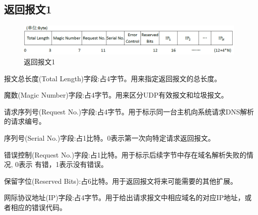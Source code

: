 \subsection{返回报文1}
\begin{figure}[H]
\centering
\includegraphics[keepaspectratio,scale=0.4]{pitures/response1.png}
\caption{返回报文1}
\end{figure}
	\begin{asparaitem}
		\item{报文总长度(Total Length)字段:占4字节。用来指定返回报文的总长度。}
		\item{魔数(Magic Number)字段:占4字节。用来区分UDP有效报文和垃圾报文。}
		\item{请求序列号(Request No.)字段:占4字节。用于标示同一台主机向系统请求DNS解析的请求编号。}
		\item{序列号(Serial No.)字段:占1比特。0表示第一次向特定请求返回报文。}
		\item{错误控制(Request No.)字段:占1比特。用于标示后续字节中存在域名解析失败的情况, 0表示
		有错，1表示没有错误。}
		\item{保留字位(Reserved Bits):占6比特。用于返回报文将来可能需要的其他扩展。}
		\item{网际协议地址(IP)字段:占4字节。用于给出请求报文中相应域名的对应IP地址，或者相应的错误代码。}
	\end{asparaitem}

